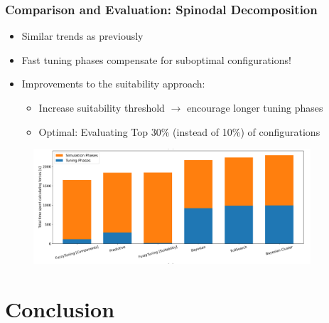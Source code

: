 \documentclass[
	10pt,
	t		%
]{beamer}
\begin{document}
\begin{frame}
	\frametitle{Comparison and Evaluation: Spinodal Decomposition}
	
	\begin{itemize}
		\item Similar trends as previously
		\item Fast tuning phases compensate for suboptimal configurations!
		\item Improvements to the suitability approach:
		      \begin{itemize}
			      \item Increase suitability threshold $\rightarrow$ encourage longer tuning phases
			      \item Optimal: Evaluating Top 30\% {\scriptsize (instead of 10\%)} of configurations
		      \end{itemize}
	\end{itemize}
	
	\begin{figure}
		\centering
		\includegraphics[width=0.92\textwidth]{figures/spinodal-total.png}
	\end{figure}
\end{frame}


\section{Conclusion}
\end{document}
